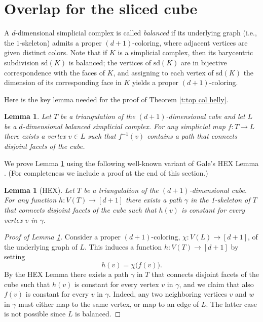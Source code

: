 \documentclass[12pt,a4paper,oneside]{amsart}\sloppy
\newtheorem{lemma}[theorem]{Lemma}
\newtheorem*{lemma*}{Lemma}
\theoremstyle{definition}
\begin{document}
\section{Overlap for the sliced cube}\label{sec:sliced-cube}
A $d$-dimensional simplicial complex is called {\em balanced} if its underlying graph
(i.e., the $1$-skeleton) admits a proper $(d+1)$-coloring, where adjacent vertices are given distinct colors. Note that if $K$ is a simplicial complex, then its barycentric subdivision $\text{sd}(K)$ is balanced; the vertices of $\text{sd}(K)$ are in bijective correspondence with the faces of $K$, and assigning to each vertex of $\text{sd}(K)$ the dimension of its corresponding face in $K$ yields a proper $(d+1)$-coloring. 

\medskip Here is the key lemma needed for the proof of Theorem \ref{t:top col helly}.

\begin{lemma}\label{l:simplicial}
Let $T$ be a triangulation of the $(d+1)$-dimensional cube and let $L$ be a $d$-dimensional balanced simplicial complex. For any simplicial map $f \colon T \to L$ there exists a vertex $v\in L$ such that $f^{-1}(v)$ contains a path that connects disjoint facets of the cube. 
\end{lemma}

We prove Lemma \ref{l:simplicial} using the following well-known variant of Gale's HEX Lemma \cite{Gale1979}. (For completeness we include a proof at the end of this section.)

\begin{lemma*}[HEX]
Let $T$ be a triangulation of the $(d+1)$-dimensional cube. For any function $h \colon V(T) \to [d+1]$  there exists a path $\gamma$ in the 1-skeleton of $T$ that connects disjoint facets of the cube such that $h(v)$ is constant for every vertex $v$ in $\gamma$.
\end{lemma*}

\begin{proof}[Proof of Lemma \ref{l:simplicial}]
Consider a proper $(d+1)$-coloring,  $\chi : V(L) \to [d+1]$,  of the underlying graph of $L$. 
This induces a function $h \colon V(T) \to [d+1]$ by setting 
\[h(v) = \chi\big( f(v) \big).\]
By the HEX Lemma there exists a path $\gamma$ in $T$ that connects disjoint facets of the cube such that $h(v)$ is constant for every vertex $v$ in $\gamma$, and we claim that also $f(v)$ is constant for every $v$ in $\gamma$. Indeed, any two neighboring vertices $v$ and $w$ in $\gamma$ must either map to the same vertex, or map to an edge of $L$. The latter case is not possible since $L$ is balanced. 
\end{proof}
\end{document}
